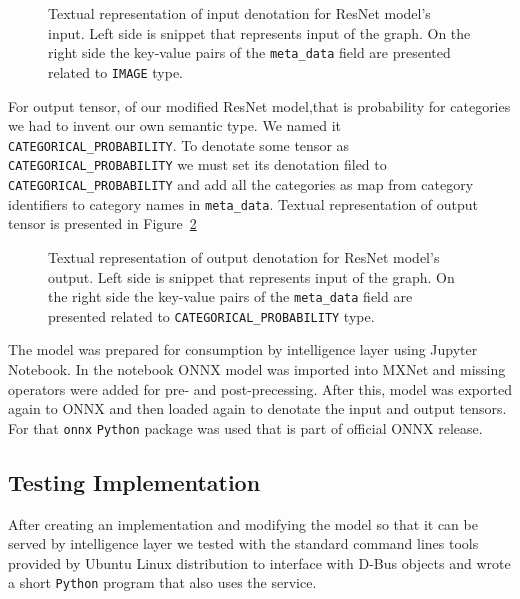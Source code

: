 \documentclass[english, 12pt, a4paper, elec, utf8, online]{aaltothesis}
\begin{document}
\begin{figure}[h!]
\centering
{}

\caption{Textual representation of input denotation for ResNet model's input. Left side is snippet that represents input of the graph. On the right side the key-value pairs of the \texttt{meta\_data} field are presented related to \texttt{IMAGE} type.}\label{fig:input_denotation}
\end{figure}

For output tensor, of our modified ResNet model,that is probability for categories we had to invent our own semantic type. We named it \texttt{CATEGORICAL\_PROBABILITY}. To denotate some tensor as \texttt{CATEGORICAL\_PROBABILITY} we must set its denotation filed to \texttt{CATEGORICAL\_PROBABILITY} and add all the categories as map from category identifiers to category names in \texttt{meta\_data}. Textual representation of output tensor is presented in Figure~\ref{fig:output_denotation}        

\begin{figure}[h!]
\centering
{}

\caption{Textual representation of output denotation for ResNet model's output. Left side is snippet that represents input of the graph. On the right side the key-value pairs of the \texttt{meta\_data} field are presented related to \texttt{CATEGORICAL\_PROBABILITY} type.}\label{fig:output_denotation}
\end{figure}

The model was prepared for consumption by intelligence layer using Jupyter Notebook. In the notebook ONNX model was imported into MXNet and missing operators were added for pre- and post-precessing. After this, model was exported again to ONNX and then loaded again to denotate the input and output tensors. For that \texttt{onnx} \texttt{Python} package was used that is part of official ONNX release.   

\subsection{Testing Implementation} 
After creating an implementation and modifying the model so that it can be served by intelligence layer we tested with the standard command lines tools provided by Ubuntu Linux distribution to interface with D-Bus objects and wrote a short \texttt{Python} program that also uses the service. 
\end{document}
